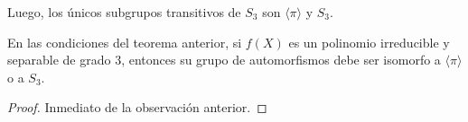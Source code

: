 \documentclass[12pt]{report}
\theoremstyle{largebreak}
\begin{document}
\begin{obs}
        Luego, los únicos subgrupos transitivos de $S_3$ son $\langle\pi\rangle$ y $S_3$.
    \end{obs}

    \begin{cor}
        En las condiciones del teorema anterior, si $f(X)$ es un polinomio irreducible y separable de grado $3$, entonces su grupo de automorfismos debe ser isomorfo a $\langle\pi\rangle$ o a $S_3$.
    \end{cor}

    \begin{proof}
        Inmediato de la observación anterior.
    \end{proof}
\end{document}
